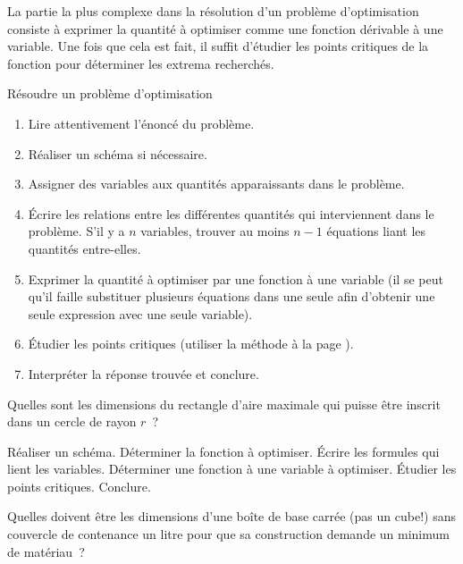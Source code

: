 La partie la plus complexe dans la résolution d'un problème d'optimisation consiste à exprimer la quantité à optimiser comme une fonction dérivable à une variable. Une fois que cela est fait, il suffit d'étudier les points critiques de la fonction pour déterminer les extrema recherchés. 
\begin{methode}
	Résoudre un problème d'optimisation
	\tcblower
	\begin{enumerate}
		\item Lire attentivement l'énoncé du problème.
		\item Réaliser un schéma si nécessaire.
		\item Assigner des variables aux quantités apparaissants dans le problème.
		\item Écrire les relations entre les différentes quantités qui interviennent dans le problème. S'il y a $n$ variables, trouver au moins $n-1$ équations liant les quantités entre-elles.
		\item Exprimer la quantité à optimiser par une fonction à une variable (il se peut qu'il faille substituer plusieurs équations dans une seule afin d'obtenir une seule expression avec une seule variable).
		\item Étudier les points critiques (utiliser la méthode à la page \pageref{met:ptcrit}).
		\item Interpréter la réponse trouvée et conclure.
	\end{enumerate}
\end{methode}

\begin{activite}
	Quelles sont les dimensions du rectangle d'aire maximale qui puisse être inscrit dans un cercle de rayon $r$~?
	\begin{tasks}
		\task Réaliser un schéma.
		\task Déterminer la fonction à optimiser.
		\task Écrire les formules qui lient les variables.
		\task Déterminer une fonction à une variable à optimiser.
		\task Étudier les points critiques.
		\task Conclure. 
	\end{tasks}
\end{activite}
\begin{activite}
	Quelles doivent être les dimensions d'une boîte de base carrée (pas un cube!) sans couvercle de contenance un litre pour que sa construction demande un minimum de matériau~?
\end{activite}


